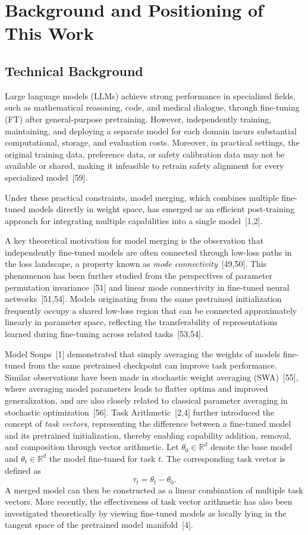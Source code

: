 \documentclass{article}
\begin{document}
\newpage
\appendix

\section{Background and Positioning of This Work}
\label{app:本研究の背景と定式化上の位置づけ}

\subsection{Technical Background}


Large language models (LLMs) achieve strong performance in specialized fields, such as mathematical reasoning, code, and medical dialogue, through fine-tuning (FT) after general-purpose pretraining. However, independently training, maintaining, and deploying a separate model for each domain incurs substantial computational, storage, and evaluation costs. Moreover, in practical settings, the original training data, preference data, or safety calibration data may not be available or shared, making it infeasible to retrain safety alignment for every specialized model~[59].

Under these practical constraints, model merging, which combines multiple fine-tuned models directly in weight space, has emerged as an efficient post-training approach for integrating multiple capabilities into a single model~[1,2].

A key theoretical motivation for model merging is the observation that independently fine-tuned models are often connected through low-loss paths in the loss landscape, a property known as \emph{mode connectivity}~[49,50]. This phenomenon has been further studied from the perspectives of parameter permutation invariance~[51] and linear mode connectivity in fine-tuned neural networks~[51,54]. Models originating from the same pretrained initialization frequently occupy a shared low-loss region that can be connected approximately linearly in parameter space, reflecting the transferability of representations learned during fine-tuning across related tasks~[53,54].

Model Soups~[1] demonstrated that simply averaging the weights of models fine-tuned from the same pretrained checkpoint can improve task performance. Similar observations have been made in stochastic weight averaging (SWA)~[55], where averaging model parameters leads to flatter optima and improved generalization, and are also closely related to classical parameter averaging in stochastic optimization~[56]. Task Arithmetic~[2,4] further introduced the concept of \emph{task vectors}, representing the difference between a fine-tuned model and its pretrained initialization, thereby enabling capability addition, removal, and composition through vector arithmetic. Let $\theta_0 \in \mathbb{R}^d$ denote the base model and $\theta_t \in \mathbb{R}^d$ the model fine-tuned for task $t$. The corresponding task vector is defined as
\[
\tau_t = \theta_t - \theta_0.
\]
A merged model can then be constructed as a linear combination of multiple task vectors. More recently, the effectiveness of task vector arithmetic has also been investigated theoretically by viewing fine-tuned models as locally lying in the tangent space of the pretrained model manifold~[4].
\end{document}
